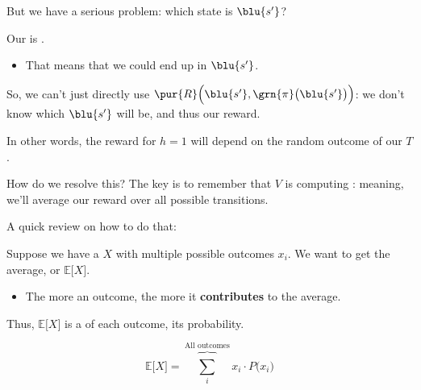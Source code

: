         But we have a serious problem: which state is $\blu{s'}$?\\

        \begin{concept}
            Our  is .

            \begin{itemize}
                \item That means that we could end up in  $\blu{s'}$. 
            \end{itemize}

            So, we can't just directly use $\pur{R} \Big( \blu{s'},\grn{\pi}\big(\blu{s'}\big) \Big)$: we don't know which $\blu{s'}$ will be, and thus our reward.
        \end{concept}

        In other words, the reward for $h=1$ will depend on the random outcome of our  $T$.

        How do we resolve this? The key is to remember that $V$ is computing : meaning, we'll average our reward over all possible transitions.

        A quick review on how to do that:\\

        \begin{concept}
            Suppose we have a  $X$ with multiple possible outcomes $x_i$. We want to get the average, or  $\mathbb{E} \big[ X \big]$.

            \begin{itemize}
                \item The more  an outcome, the more it \textbf{contributes} to the average.
            \end{itemize}

            Thus, $\mathbb{E} \big[ X \big]$ is a  of each outcome,  its probability.

            \begin{equation*}
                \mathbb{E} \big[ X \big] = 
                    \overbrace{\sum_{i} }^{\text{All outcomes}} 
                    x_i \cdot P \big(x_i\big)
            \end{equation*}
            
        \end{concept}

